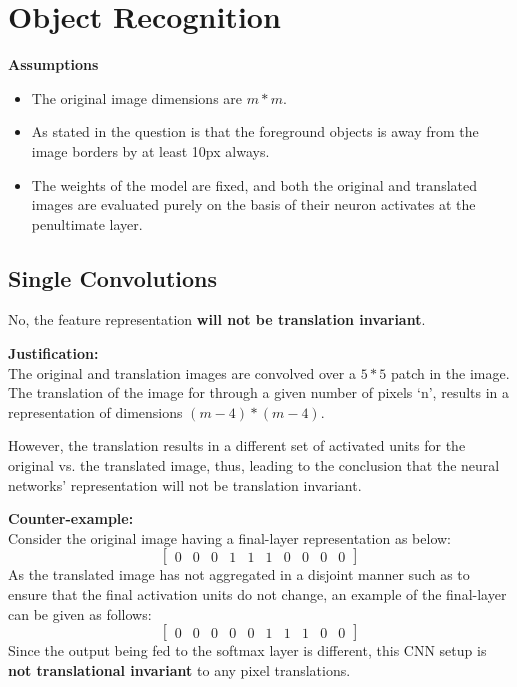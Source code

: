 \documentclass[parskip=half]{scrartcl}
\begin{document}



\section{Object Recognition} %
\label{sec:object_recognition}

    \textbf{Assumptions}
    \begin{itemize}
        \item 
        The original image dimensions are $m*m$.
        \item 
        As stated in the question is that the foreground objects is away from the image borders by at least 10px always.
        \item 
        The weights of the model are fixed, and both the original and translated images are evaluated purely on the basis of their neuron activates at the penultimate layer.
    \end{itemize}

    \subsection{Single Convolutions} %
    \label{sub:single_convolutions}

        No, the feature representation \textbf{will not be translation invariant}.

        \textbf{Justification:}\\
        The original and translation images are convolved over a $5*5$ patch in the image.
        The translation of the image for through a given number of pixels `n', results in a representation of dimensions $(m-4)*(m-4)$.

        However, the translation results in a different set of activated units for the original vs. the translated image, thus, leading to the conclusion that the neural networks' representation will not be translation invariant.

        \textbf{Counter-example:}\\
        Consider the original image having a final-layer representation as below:
        \begin{equation*}
            \begin{bmatrix}
                0 & 0 & 0 & 1 & 1 & 1 & 0 & 0 & 0 & 0
            \end{bmatrix}
        \end{equation*}
        As the translated image has not aggregated in a disjoint manner such as to ensure that the final activation units do not change, an example of the final-layer can be given as follows:
        \begin{equation*}
            \begin{bmatrix}
                0 & 0 & 0 & 0 & 0 & 1 & 1 & 1 & 0 & 0
            \end{bmatrix}
        \end{equation*}
        Since the output being fed to the softmax layer is different, this CNN setup is \textbf{not translational invariant} to any pixel translations.
\end{document}
